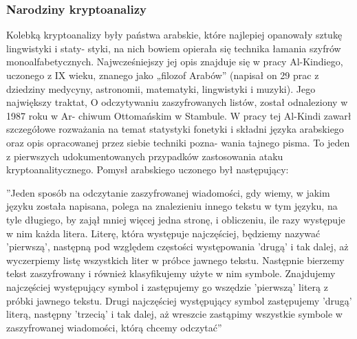 \documentclass[a4paper]{article}
\begin{document}
\subsubsection{Narodziny kryptoanalizy}
Kolebką kryptoanalizy były państwa arabskie, które najlepiej opanowały sztukę lingwistyki i staty-
styki, na nich bowiem opierała się technika łamania szyfrów monoalfabetycznych. Najwcześniejszy
jej opis znajduje się w pracy Al-Kindiego, uczonego z IX wieku, znanego jako „filozof Arabów”
(napisał on 29 prac z dziedziny medycyny, astronomii, matematyki, lingwistyki i muzyki). Jego
największy traktat, O odczytywaniu zaszyfrowanych listów, został odnaleziony w 1987 roku w Ar-
chiwum Ottomańskim w Stambule. W pracy tej Al-Kindi zawarł szczegółowe rozważania na temat
statystyki fonetyki i składni języka arabskiego oraz opis opracowanej przez siebie techniki pozna-
wania tajnego pisma. To jeden z pierwszych udokumentowanych przypadków zastosowania ataku
kryptoanalitycznego. Pomysł arabskiego uczonego był następujący:\\
\begin{center}
”Jeden sposób na odczytanie zaszyfrowanej wiadomości, gdy wiemy, w jakim języku została
napisana, polega na znalezieniu innego tekstu w tym języku, na tyle długiego, by zajął mniej
więcej jedna stronę, i obliczeniu, ile razy występuje w nim każda litera. Literę, która występuje
najczęściej, będziemy nazywać ’pierwszą’, następną pod względem częstości występowania ’drugą’
i tak dalej, aż wyczerpiemy listę wszystkich liter w próbce jawnego tekstu. Następnie bierzemy
tekst zaszyfrowany i również klasyfikujemy użyte w nim symbole. Znajdujemy najczęściej
występujący symbol i zastępujemy go wszędzie ’pierwszą’ literą z próbki jawnego tekstu. Drugi
najczęściej występujący symbol zastępujemy ’drugą’ literą, następny ’trzecią’ i tak dalej, aż
wreszcie zastąpimy wszystkie symbole w zaszyfrowanej wiadomości, którą chcemy odczytać”\cite{odwol2}
\end{center}
\end{document}
